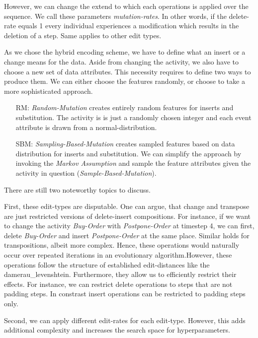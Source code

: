 \documentclass[./../../paper.tex]{subfiles}
\begin{document}
However, we can change the extend to which each operations is applied over the sequence. We call these parameters \emph{mutation-rates}. In other words, if the delete-rate equals 1 every individual experiences a modification which results in the deletion of a step. Same applies to other edit types.

As we chose the hybrid encoding scheme, we have to define what an insert or a change means for the data. Aside from changing the activity, we also have to choose a new set of data attributes. This necessity requires to define two ways to produce them. We can either choose the features randomly, or choose to take a more sophisticated  approach.

\begin{enumerate}
    \item[RM:] \emph{Random-Mutation} creates entirely random features for inserts and substitution. The activity is is just a randomly chosen integer and each event attribute is drawn from a normal-distribution.
    \item[SBM:] \emph{Sampling-Based-Mutation} creates sampled features based on data distribution for inserts and substitution. We can simplify the approach by invoking the \emph{Markov Assumption} and sample the feature attributes given the activity in question (\emph{Sample-Based-Mutation}).

\end{enumerate}

There are still two noteworthy topics to discuss.

First, these edit-types are disputable. One can argue, that change and transpose are just restricted versions of delete-insert compositions. For instance, if we want to change the activity \emph{Buy-Order} with \emph{Postpone-Order} at timestep 4, we can first, delete \emph{Buy-Order} and insert \emph{Postpone-Order} at the same place. Similar holds for transpositions, albeit more complex. Hence, these operations would naturally occur over repeated iterations in an evolutionary algorithm.However, these operations follow the structure of established edit-distances like the \gls{damerau_levenshtein}. Furthermore, they allow us to efficiently restrict their effects. For instance, we can restrict delete operations to steps that are not padding steps. In constrast insert operations can be restricted to padding steps only.

Second, we can apply different edit-rates for each edit-type. However, this adds additional complexity and increases the search space for hyperparameters.
\end{document}
